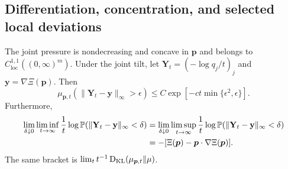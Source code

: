 \subsection{Differentiation, concentration, and selected local deviations}
\begin{proposition}\label{fp:prop:joint-regularity}
The joint pressure is nondecreasing and concave in $\boldsymbol p$ and belongs to $C^{1,1}_{\mathrm{loc}}((0,\infty)^m)$. Under the joint tilt, let $\mathbf Y_t=(-\log q_j/t)_j$ and $\mathbf y=\nabla\Xi(\boldsymbol p)$. Then
\begin{equation}\label{fp:eq:joint-concentration}
 \mu_{\boldsymbol p,t}(\|\mathbf Y_t-\mathbf y\|_\infty>\epsilon)
 \le C\exp[-ct\min\{\epsilon^2,\epsilon\}].
\end{equation}
Furthermore,
\begin{align}
 \lim_{\delta\downarrow0}\liminf_{t\to\infty}\frac1t
 \log\mathbb P(\|\mathbf Y_t-\mathbf y\|_\infty<\delta)
 &=\lim_{\delta\downarrow0}\limsup_{t\to\infty}\frac1t
 \log\mathbb P(\|\mathbf Y_t-\mathbf y\|_\infty<\delta)\notag\\
 &=-[\Xi(\boldsymbol p)-\boldsymbol p\cdot\nabla\Xi(\boldsymbol p)].\label{fp:eq:joint-local-ldp}
\end{align}
The same bracket is $\lim_t t^{-1}\operatorname{D_{\mathrm{KL}}}(\mu_{\boldsymbol p,t}\Vert\mu)$.
\end{proposition}
